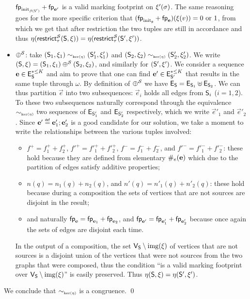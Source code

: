 \begin{proofE}
\begin{itemize}
      $\mathsf{fp}_{\mathrm{init}_{\beta({\mathsf{S}'})}} + \mathsf{fp}_{\mathbf{e'}}$
      is a valid marking footprint on $\xi'(\sigma)$.
      The same reasoning goes for the more specific criterion that
      $(\mathsf{fp}_{\mathrm{init}_{\mathsf{p}}} + \mathsf{fp}_{\mathbf{e}})(\xi(v)) = 0 \text{ or } 1$,
      from which we get that after restriction the two tuples are still in accordance
      and thus $\eta(\mathsf{restrict}^{\mathcal{S}}_{{\tau}}(\mathsf{S},\xi))
        = \eta(\mathsf{restrict}^{\mathcal{S}}_{{\tau}}(\mathsf{S}',\xi'))$.
    \item \underline{$\oplus^{\mathcal{S}}$}: take $(\mathsf{S}_1,\xi_1)
      \sim_{\scriptscriptstyle{\mathrm{ker}(\eta)}} (\mathsf{S}'_1,\xi'_1)$ and $(\mathsf{S}_2,\xi_2)
      \sim_{\scriptscriptstyle{\mathrm{ker}(\eta)}} (\mathsf{S}'_2,\xi'_2)$.  We write
      $(\mathsf{S},\xi) = (\mathsf{S}_1,\xi_1) \oplus^{\mathcal{S}}
      (\mathsf{S}_2,\xi_2)$, and similarly for $(\mathsf{S}',\xi')$.
      We consider a sequence $\mathbf{e} \in \mathsf{E}_{\mathsf{S}}^{*\leq K}$
      and aim to prove that one can find $\mathbf{e'} \in
      \mathsf{E}_{\mathsf{S}'}^{*\leq K}$ that results in the same tuple
      through $\omega$. By definition of $\oplus^{\mathcal{S}}$ we have
      $\mathsf{E}_{\mathsf{S}} = \mathsf{E}_{\mathsf{S}_1} \uplus \mathsf{E}_{\mathsf{S}_2}$.  We
      can thus partition $\vec{e}$ into two subsequences: $\vec{e}_i$
      holds all edges from $\mathsf{S}_i$ ($i = 1,2$).  To these two
      subsequences naturally correspond through the equivalence
      $\sim_{\scriptscriptstyle{\mathrm{ker}(\eta)}}$ two sequences of $\mathsf{E}_{\mathsf{S}'_1}$ and
      $\mathsf{E}_{\mathsf{S}'_2}$ respectively, which we write $\vec{e}'_1$
      and $\vec{e}'_2$.  Since $\mathbf{e}' \stackrel{\scriptscriptstyle{\mathsf{def}}}{=} \mathbf{e}'_1 ;
      \mathbf{e}'_2$ is a good candidate for our solution, we take a
      moment to write the relationships between the various tuples
      involved:
      \begin{itemize}
        \item $f^+ = f^+_1 + f^+_2$, $f'^+ = f'^+_1 + f'^+_2$,
          $f^- = f^-_1 + f^-_2$, and $f'^- = f'^-_1 + f'^-_2$:
          these hold because they are defined from elementary
          $\#_{e}(\mathbf{e})$ which due to the partition of edges
          satisfy additive properties;
        \item $n(q) = n_1(q) + n_2(q)$, and $n'(q) = n'_1(q) + n'_2(q)$:
          these hold because during a composition the sets of vertices that
          are not sources are disjoint in the result;
        \item and naturally $\mathsf{fp}_{\mathbf{e}} = \mathsf{fp}_{\mathbf{e}_1} + \mathsf{fp}_{\mathbf{e}_2}$,
          and $\mathsf{fp}_{\mathbf{e}'} = \mathsf{fp}_{\mathbf{e}'_1} + \mathsf{fp}_{\mathbf{e}'_2}$
          because once again the sets of edges are disjoint each time.
      \end{itemize}
      In the output of a composition, the set $\mathsf{V}_{\mathsf{S}}\setminus{\mathrm{img}({\xi})}$
      of vertices that are not sources is a disjoint union of the vertices that were not sources
      from the two graphs that were composed, thus the condition
      ``is a valid marking footprint over $\mathsf{V}_{\mathsf{S}}\setminus{\mathrm{img}({\xi})}$''
      is easily preserved.
      Thus $\eta(\mathsf{S},\xi) = \eta(\mathsf{S}',\xi')$.
  \end{itemize}
  We conclude that $\sim_{\scriptscriptstyle{\mathrm{ker}(\eta)}}$ is a \hrtext{} congruence.
  \qed
\end{proofE}

